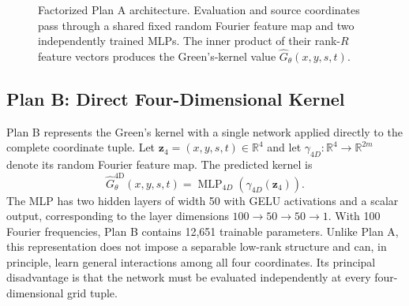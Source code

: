 \documentclass[11pt,a4paper]{article}
\newcommand{\R}{\mathbb{R}}
\begin{document}
\begin{figure}[H]
{%
  }
  \caption{Factorized Plan A architecture. Evaluation and source coordinates pass through a shared fixed random Fourier feature map and two independently trained MLPs. The inner product of their rank-$R$ feature vectors produces the Green's-kernel value $\widehat G_\theta(x,y,s,t)$.}
  \label{fig:architecture}
\end{figure}

\subsection{Plan B: Direct Four-Dimensional Kernel}

Plan B represents the Green's kernel with a single network applied directly to the complete coordinate tuple. Let $\bm z_4=(x,y,s,t)\in\R^4$ and let $\gamma_{4D}:\R^4\rightarrow\R^{2m}$ denote its random Fourier feature map. The predicted kernel is
\begin{equation}
  \widehat G^{\mathrm{4D}}_{\theta}(x,y,s,t)
  =\operatorname{MLP}_{4D}\!\left(\gamma_{4D}(\bm z_4)\right).
  \label{eq:planB}
\end{equation}
The MLP has two hidden layers of width 50 with GELU activations and a scalar output, corresponding to the layer dimensions $100\rightarrow50\rightarrow50\rightarrow1$.
 With 100 Fourier frequencies, Plan B contains 12,651 trainable parameters. Unlike Plan A, this representation does not impose a separable low-rank structure and can, in principle,
  learn general interactions among all four coordinates. Its principal disadvantage is that the network must be evaluated independently at every four-dimensional grid tuple.
\end{document}
